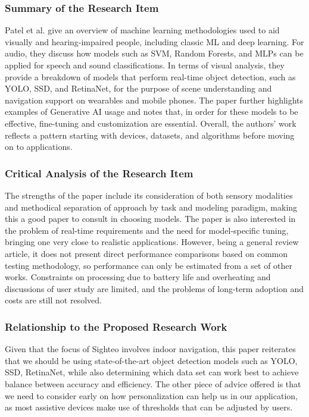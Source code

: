 \documentclass{FastFyp}
\begin{document}
\subsubsection{Summary of the Research Item}  
Patel et al. \cite{ref:patel2025enhancing} give an overview of machine learning methodologies used to aid visually and hearing-impaired people, including classic ML and deep learning. For audio, they discuss how models such as SVM, Random Forests, and MLPs can be applied for speech and sound classifications. In terms of visual analysis, they provide a breakdown of models that perform real-time object detection, such as YOLO, SSD, and RetinaNet, for the purpose of scene understanding and navigation support on wearables and mobile phones. The paper further highlights examples of Generative AI usage and notes that, in order for these models to be effective, fine-tuning and customization are essential. Overall, the authors' work reflects a pattern starting with devices, datasets, and algorithms before moving on to applications.

\subsubsection{Critical Analysis of the Research Item}  
The strengths of the paper include its consideration of both sensory modalities and methodical separation of approach by task and modeling paradigm, making this a good paper to consult in choosing models. The paper is also interested in the problem of real-time requirements and the need for model-specific tuning, bringing one very close to realistic applications. However, being a general review article, it does not present direct performance comparisons based on common testing methodology, so performance can only be estimated from a set of other works. Constraints on processing due to battery life and overheating and discussions of user study are limited, and the problems of long-term adoption and costs are still not resolved.

\subsubsection{Relationship to the Proposed Research Work}  
Given that the focus of Sighteo involves indoor navigation, this paper reiterates that we should be using state-of-the-art object detection models such as YOLO, SSD, RetinaNet, while also determining which data set can work best to achieve balance between accuracy and efficiency. The other piece of advice offered is that we need to consider early on how personalization can help us in our application, as most assistive devices make use of thresholds that can be adjusted by users.
\end{document}
